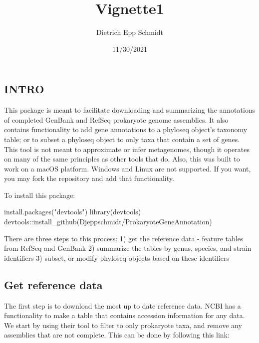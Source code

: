 \documentclass[
]{article}
\title{Vignette1}
\author{Dietrich Epp Schmidt}
\date{11/30/2021}
\newenvironment{Shaded}{\begin{snugshade}}{\end{snugshade}}
\newcommand{\FunctionTok}[1]{\textcolor[rgb]{0.00,0.00,0.00}{#1}}
\newcommand{\NormalTok}[1]{#1}
\newcommand{\SpecialCharTok}[1]{\textcolor[rgb]{0.00,0.00,0.00}{#1}}
\newcommand{\StringTok}[1]{\textcolor[rgb]{0.31,0.60,0.02}{#1}}
\begin{document}
\maketitle

\hypertarget{intro}{%
\subsection{INTRO}\label{intro}}

This package is meant to facilitate downloading and summarizing the
annotations of completed GenBank and RefSeq prokaryote genome
assemblies. It also contains functionality to add gene annotations to a
phyloseq object's taxonomy table; or to subset a phyloseq object to only
taxa that contain a set of genes. This tool is not meant to approximate
or infer metagenomes, though it operates on many of the same principles
as other tools that do. Also, this was built to work on a macOS
platform. Windows and Linux are not supported. If you want, you may fork
the repository and add that functionality.

To install this package:

\begin{Shaded}
\begin{Highlighting}[]
\FunctionTok{install.packages}\NormalTok{(}\StringTok{"devtools"}\NormalTok{)}
\FunctionTok{library}\NormalTok{(devtools)}
\NormalTok{devtools}\SpecialCharTok{::}\FunctionTok{install\_github}\NormalTok{(}\StringTok{\textquotesingle{}Djeppschmidt/ProkaryoteGeneAnnotation\textquotesingle{}}\NormalTok{)}
\end{Highlighting}
\end{Shaded}

There are three steps to this process: 1) get the reference data -
feature tables from RefSeq and GenBank 2) summarize the tables by genus,
species, and strain identifiers 3) subset, or modify phyloseq objects
based on these identifiers

\hypertarget{get-reference-data}{%
\subsection{Get reference data}\label{get-reference-data}}

The first step is to download the most up to date reference data. NCBI
has a functionality to make a table that contains accession information
for any data. We start by using their tool to filter to only prokaryote
taxa, and remove any assemblies that are not complete. This can be done
by following this link:
\end{document}
